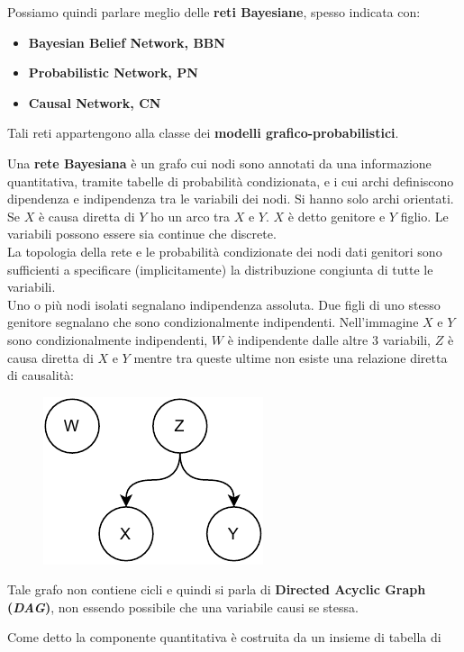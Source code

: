 \documentclass[a4paper,12pt, oneside]{book}
\begin{document}
Possiamo quindi parlare meglio delle \textbf{reti Bayesiane}, spesso indicata
con:
\begin{itemize}
  \item \textbf{Bayesian Belief Network, BBN}
  \item \textbf{Probabilistic Network, PN}
  \item \textbf{Causal Network, CN}
\end{itemize}
Tali reti appartengono alla classe dei \textbf{modelli
  grafico-probabilistici}.\\ 
\begin{definizione}
  Una \textbf{rete Bayesiana} è un grafo cui nodi sono annotati da una
  informazione quantitativa, tramite tabelle di probabilità condizionata, e i
  cui archi definiscono dipendenza e indipendenza tra le variabili dei nodi. Si
  hanno solo archi orientati. Se $X$ è causa diretta di $Y$ ho un arco tra $X$ e
  $Y$. $X$ è detto genitore e $Y$ figlio. Le variabili possono essere sia
  continue che discrete.\\
  La topologia della rete e le probabilità condizionate dei nodi dati genitori
  sono sufficienti a specificare (implicitamente) la distribuzione congiunta di
  tutte le variabili.\\
  Uno o più nodi isolati segnalano indipendenza assoluta. Due figli di uno
  stesso genitore segnalano che sono condizionalmente
  indipendenti. Nell'immagine $X$ e $Y$ sono condizionalmente indipendenti, $W$
  è indipendente dalle altre 3 variabili, $Z$ è causa diretta di $X$ e $Y$
  mentre tra queste ultime non esiste una relazione diretta di causalità:
  \begin{figure}[H]
    \centering
    \includegraphics[scale = 0.9]{img/b3.pdf}
  \end{figure}
  Tale grafo non contiene cicli e quindi si parla di \textbf{Directed Acyclic
    Graph (\textit{DAG})}, non essendo possibile che una variabile causi se
  stessa. 
\end{definizione}
Come detto la componente quantitativa è costruita da un insieme di tabella di
\end{document}
